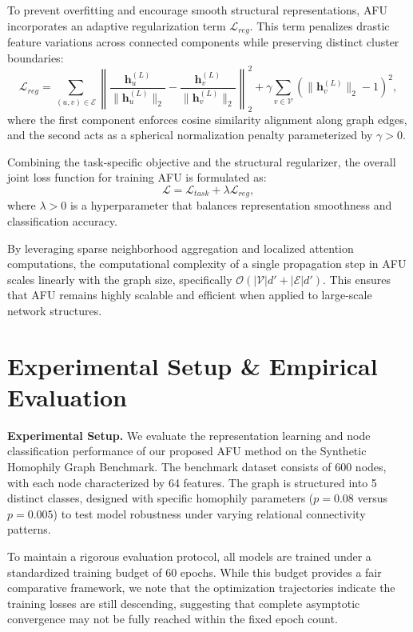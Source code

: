 \documentclass[10pt,twocolumn]{article}
\begin{document}
To prevent overfitting and encourage smooth structural representations, \textsc{AFU} incorporates an adaptive regularization term $\mathcal{L}_{reg}$. This term penalizes drastic feature variations across connected components while preserving distinct cluster boundaries:
\begin{equation}
    \mathcal{L}_{reg} = \sum_{(u,v) \in \mathcal{E}} \left\| \frac{\mathbf{h}_u^{(L)}}{\|\mathbf{h}_u^{(L)}\|_2} - \frac{\mathbf{h}_v^{(L)}}{\|\mathbf{h}_v^{(L)}\|_2} \right\|_2^2 + \gamma \sum_{v \in \mathcal{V}} \left( \|\mathbf{h}_v^{(L)}\|_2 - 1 \right)^2,
\end{equation}
where the first component enforces cosine similarity alignment along graph edges, and the second acts as a spherical normalization penalty parameterized by $\gamma > 0$.

Combining the task-specific objective and the structural regularizer, the overall joint loss function for training \textsc{AFU} is formulated as:
\begin{equation}
    \mathcal{L} = \mathcal{L}_{task} + \lambda \mathcal{L}_{reg},
\end{equation}
where $\lambda > 0$ is a hyperparameter that balances representation smoothness and classification accuracy.

By leveraging sparse neighborhood aggregation and localized attention computations, the computational complexity of a single propagation step in \textsc{AFU} scales linearly with the graph size, specifically $\mathcal{O}(|\mathcal{V}|d' + |\mathcal{E}|d')$. This ensures that \textsc{AFU} remains highly scalable and efficient when applied to large-scale network structures.

\section{Experimental Setup \& Empirical Evaluation}
\noindent\textbf{Experimental Setup.} We evaluate the representation learning and node classification performance of our proposed \textsc{AFU} method on the Synthetic Homophily Graph Benchmark. The benchmark dataset consists of 600 nodes, with each node characterized by 64 features. The graph is structured into 5 distinct classes, designed with specific homophily parameters ($p = 0.08$ versus $p = 0.005$) to test model robustness under varying relational connectivity patterns. 

To maintain a rigorous evaluation protocol, all models are trained under a standardized training budget of 60 epochs. While this budget provides a fair comparative framework, we note that the optimization trajectories indicate the training losses are still descending, suggesting that complete asymptotic convergence may not be fully reached within the fixed epoch count.
\end{document}

